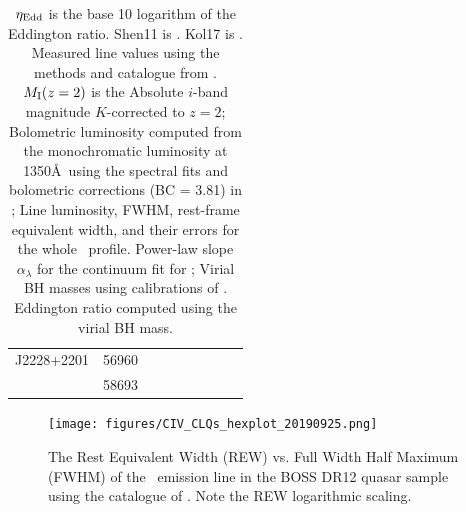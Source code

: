 \documentclass[a4paper,fleqn,usenatbib]{mnras}
\begin{document}
\begin{table}
\begin{tabular}{l l  ll ll cc r}
J2228+2201               & 56960                          &                                       &                                                &                              &                               &                 &                                        & \\
                                  & 58693                          &                                       &                                               &                               &                                &                &                   &  \\
    \hline
    \hline
  \end{tabular}
  \caption{$\eta_{\rm Edd}$ is the base 10 logarithm of the Eddington ratio.
        Shen11 is \citet{Shen2011}. 
        Kol17 is \citet{Kozlowski2017}.
        Measured line values using the methods and catalogue from
\citet{Shen2011}.  $M_{\rm I}(z=2)$ is the Absolute $i$-band magnitude
$K$-corrected to $z = 2$; Bolometric luminosity computed from the
monochromatic luminosity at 1350\AA\ using the spectral fits and
bolometric corrections (BC = 3.81) in \citet{Richards2006b}; Line
luminosity, FWHM, rest-frame equivalent width, and their errors for
the whole \civ\ profile.  Power-law slope $\alpha_{\lambda}$ for the
continuum fit for \civ; Virial BH masses using calibrations of
\citet{VestergaardPeterson2006}.  Eddington ratio computed using the
virial BH mass.
      }
\end{table}





\begin{figure}
  \centering
  \texttt{[image: figures/CIV\_CLQs\_hexplot\_20190925.png]}
   \vspace{-12pt}
  \caption[]{The Rest Equivalent Width (REW) vs. Full Width Half Maximum (FWHM) 
of the \civ\ emission line in the BOSS DR12 quasar sample using the catalogue 
of \citet{Hamann2017}. Note the REW logarithmic scaling.}
  \label{fig:REWvsFWHM}
\end{figure}
\end{document}

